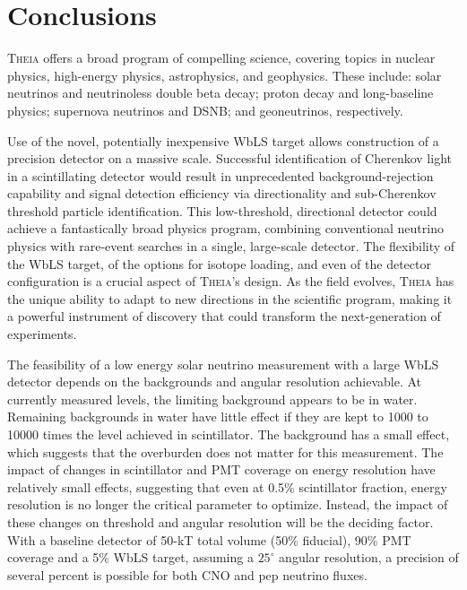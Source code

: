 \documentclass[11pt,prd,letterpaper,amsmath,amssymb,final,nofootinbib
,unsortedaddress,superscriptaddress
]{revtex4-1}
\begin{document}
\section{Conclusions}

\textsc{Theia} offers a broad program of compelling science, covering topics in nuclear physics, high-energy physics, astrophysics, and geophysics.  These include: solar neutrinos and neutrinoless double beta decay; proton decay and long-baseline physics; supernova neutrinos and DSNB;  and geoneutrinos, respectively.

Use of the novel, potentially inexpensive WbLS target  allows construction of a precision detector on a massive scale.  
Successful identification of Cherenkov light in a scintillating detector would result in unprecedented background-rejection capability and signal detection efficiency via directionality and sub-Cherenkov threshold particle identification.  This low-threshold, directional detector could achieve a fantastically broad physics program, combining conventional neutrino physics with rare-event searches in a single, large-scale detector.
The flexibility of the WbLS target, of the options for isotope loading, and even of the detector configuration is a crucial aspect of \textsc{Theia}'s design.  As the field evolves, \textsc{Theia} has the unique ability to adapt to new directions in the scientific program, making it a powerful instrument of discovery that could transform the next-generation of experiments.  

The feasibility of a low energy solar neutrino measurement with a large WbLS detector depends on the backgrounds and angular resolution achievable. At currently measured levels, the limiting background appears to be  in water.  Remaining backgrounds in water have little effect if they are kept to 1000 to 10000 times the level achieved in scintillator. The  background has a small effect, which suggests that the overburden does not matter for this measurement. The impact of changes in scintillator and PMT coverage on energy resolution have relatively small effects,  suggesting that even at 0.5\% scintillator fraction, energy resolution is no longer the critical parameter to optimize. Instead, the impact of these changes on threshold and angular resolution will be the deciding factor.  With a baseline detector of 50-kT total volume (50\% fiducial), 90\% PMT coverage and a 5\% WbLS target, assuming  a $25^\circ$ angular resolution, a precision of several percent is possible for both CNO and pep neutrino fluxes.
\end{document}
